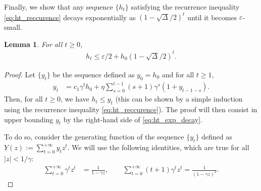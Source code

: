 \documentclass{article}
\theoremstyle{plain}
\newtheorem{lemma}[theorem]{Lemma}
\theoremstyle{definition}
\theoremstyle{remark}
\begin{document}
Finally, we show that any sequence $\{h_t\}$ satisfying the recurrence inequality \eqref{eq:ht_reccurence} decays exponentially as $(1-\sqrt{\Delta}/2)^t$ until it becomes $\varepsilon$-small.

\begin{lemma}\label{lemma:ht_exp_decay}
    For all $t\geqslant 0$,
  \begin{align}\label{eq:ht_exp_decay}
    h_t \leqslant \varepsilon / 2 + h_0 \left(1 - \sqrt{\Delta}/2\right)^t.
  \end{align}
\end{lemma}

\begin{proof}
  Let $\{y_t\}$ be the sequence defined as $y_0 = h_0$ and for all $t\geqslant 1$,
  \begin{align}\label{eq:yt_def}
    y_t & = c_1 \gamma^t h_0 + \eta \sum_{s=0}^{t-1} (s+1) \gamma^s (1 + y_{t-1-s}).
  \end{align}
  Then, for all $t \geqslant 0$, we have $h_t \leqslant y_t$ (this can be shown by a simple induction using the recurrence inequality \eqref{eq:ht_reccurence}). The proof will then consist in upper bounding $y_t$ by the right-hand side of \eqref{eq:ht_exp_decay}.

  To do so, consider the generating function of the sequence $\{y_t\}$ defined as $Y(z) := \sum_{t=0}^{+\infty} y_t z^t$. We will use the following identities, which are true for all $\vert z \vert < 1/\gamma$:
  \begin{align*}
    \sum_{t=0}^{+\infty} \gamma^t z^t & = \frac{1}{1 - \gamma z}, \quad \quad
    \sum_{t=0}^{+\infty} (t+1) \gamma^t z^t = \frac{1}{(1 - \gamma z)^2}.
  \end{align*}
  

\end{proof}
\end{document}
